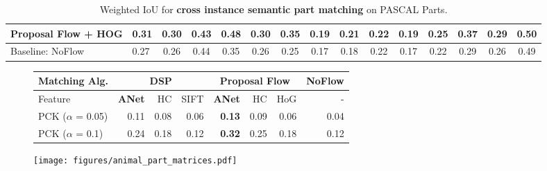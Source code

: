\documentclass[10pt,twocolumn,letterpaper]{article}
\def\methodname{ANet\xspace}
\begin{document}
\begin{table*}[t]
\begin{tabular}{laccccccccccccc}
Proposal Flow + HOG \cite{ham2016}& 0.31 & 0.30 & 0.43 & 0.48 & 0.30 & 0.35 & 0.19 & 0.21 & 0.22 & 0.19 & 0.25 & 0.37 & 0.29 & 0.50  \\ \hline
Baseline: NoFlow           &  0.27 & 0.26 & 0.44 & 0.35 & 0.26 & 0.25 & 0.17 & 0.18 & 0.22 & 0.17 & 0.22 & 0.29 & 0.26 & 0.49 \\ \hline
\end{tabular}
\vspace{-0.2cm}
\caption{Weighted IoU for \textbf{cross instance semantic part matching} on PASCAL Parts.}%
\label{tab:transferpascalparts}
\vspace{-0.2cm}
\end{table*}\begin{figure}
\centering
\scriptsize
\begin{tabular}{l|rrr|rrr|r} 
\hline
Matching Alg.         & \multicolumn{3}{c|}{DSP}             & \multicolumn{3}{c|}{Proposal Flow}                                        & NoFlow  \\ \hline
Feature               &    \textbf{\methodname}  & HC   & SIFT        & \textbf{\methodname}                        & HC      & HoG    & -       \\ \hline
PCK ($\alpha$ = 0.05) &    0.11         & 0.08 & 0.06        & \textbf{0.13}                      & 0.09    & 0.06   & 0.04    \\
PCK ($\alpha$ = 0.1)  &    0.24         & 0.18 & 0.12        & \textbf{0.32}                      & 0.25    & 0.18   & 0.12    \\ \hline
\end{tabular}
\label{tab:transferanimals}
\vspace{0.2cm}
\texttt{[image: figures/animal\_part\_matrices.pdf]}
\label{fig:animalmatrices}
\vspace{-0.35cm}
\end{figure}\begin{figure*}[t]
\newcommand{\eyetransferw}{0.3\textwidth}%

\end{figure*}
\end{document}
